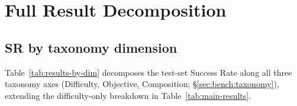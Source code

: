 \documentclass{llmxive}
\begin{document}
\section{Full Result Decomposition}\label{app:results-detail}

\subsection{SR by taxonomy dimension}

Table~\ref{tab:results-by-dim} decomposes the test-set Success Rate along all three taxonomy axes (Difficulty, Objective, Composition; §\ref{sec:bench:taxonomy}), extending the difficulty-only breakdown in Table~\ref{tab:main-results}.
\end{document}
